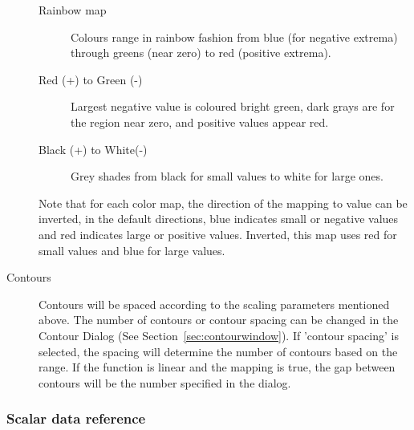 \begin{description}
\begin{description}
      \item [Rainbow map] Colours range in rainbow fashion from
        blue (for negative extrema) through greens (near zero)
        to red (positive extrema).
        
      \item [Red (+) to Green (-)] Largest negative value is coloured
        bright green, dark grays are for the region near zero, and
        positive values appear red. 
        
      \item [Black (+) to White(-)] Grey shades from black for small
        values to white for large ones.
        
    \end{description}
      Note that for each color map, the direction of the mapping to value
      can be inverted, \eg{} in the default directions, blue indicates
      small or negative values and red indicates large or positive values.
      Inverted, this map uses red for small values and blue for large
      values.
      
  \item[Contours] 
    Contours will be spaced according to the scaling parameters mentioned
    above.  The number of contours or contour spacing can be changed in the
    Contour Dialog (See Section~\ref{sec:contourwindow}).  If 'contour 
    spacing' is selected, the spacing will determine the number of contours
    based on the range.  If the function is linear and the mapping is true,
    the gap between contours will be the number specified in the dialog.
    
    
\end{description}

\subsubsection{Scalar data reference}
\label{sec:reference} 

